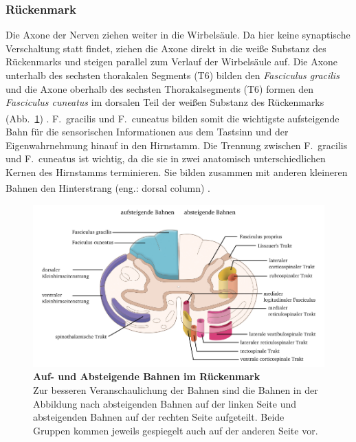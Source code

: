 \documentclass[12pt,a4paper,pdftex]{article}
\begin{document}
\subsubsection*{Rückenmark}
Die Axone der Nerven ziehen weiter in die Wirbelsäule. Da hier keine synaptische Verschaltung statt findet, ziehen die Axone direkt in die weiße Substanz des Rückenmarks und steigen parallel zum Verlauf der Wirbelsäule auf. Die Axone unterhalb des sechsten thorakalen Segments (T6) bilden den \textit{Fasciculus gracilis}  und die Axone oberhalb des sechsten Thorakalsegments (T6) formen den \textit{Fasciculus cuneatus}  im dorsalen Teil der weißen Substanz des Rückenmarks (Abb.~\ref{fig:bahnen_rueckenmark}) \textsuperscript{\cite[8]{paxinos2014rat}}. F.~gracilis und F.~cuneatus bilden somit die wichtigste aufsteigende Bahn für die sensorischen Informationen aus dem Tastsinn und der Eigenwahrnehmung hinauf in den Hirnstamm. 
Die Trennung zwischen F.~gracilis und F.~cuneatus ist wichtig, da die sie in zwei anatomisch unterschiedlichen Kernen des Hirnstamms terminieren. Sie bilden zusammen mit anderen kleineren Bahnen den Hinterstrang (eng.: dorsal column) \textsuperscript{\cite[22]{kandel2013principles}}. 

\begin{figure}[H]
    \centering
    \includegraphics[width = \textwidth] {pictures/somatosensory/aufabsteigendeBahnen_Rueckenmark.png}
    \caption[Auf- und Absteigende Bahnen im Rückenmark]{\textbf{Auf- und Absteigende Bahnen im Rückenmark}\\ Zur besseren Veranschaulichung der Bahnen sind die Bahnen in der Abbildung nach absteigenden Bahnen auf der linken Seite und absteigenden Bahnen auf der rechten Seite aufgeteilt. Beide Gruppen kommen jeweils gespiegelt auch auf der anderen Seite vor.\\
    \textsuperscript{\cite[8]{crossman2014neuroanatomy}}}
    \label{fig:bahnen_rueckenmark}
\end{figure}
\end{document}
